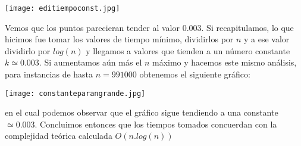 \documentclass{article}
\begin{document}
\texttt{[image: editiempoconst.jpg]}

Vemos que los puntos parecieran tender al valor 0.003. Si recapitulamos, lo que hicimos fue tomar los valores de tiempo m\'inimo, dividirlos por $n$ y a ese valor dividirlo por $log(n)$ y llegamos a valores que tienden a un n\'umero constante $k \simeq 0.003$.
\newline Si aumentamos a\'un m\'as el $n$ m\'aximo y hacemos este mismo an\'alisis, para instancias de hasta $n = 991000$ obtenemos el siguiente gr\'afico:

\texttt{[image: constanteparangrande.jpg]}

en el cual podemos observar que el gr\'afico sigue tendiendo a una constante $\simeq 0.003$.
\newline Concluimos entonces que los tiempos tomados concuerdan con la complejidad te\'orica calculada $O(n.log(n))$
\end{document}
